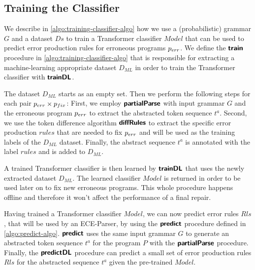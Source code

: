 \subsection{Training the Classifier}
\label{sec:whole-system:training-classifier}

\begin{figure}[t]
  \centering
  \begin{minipage}[t]{0.47\linewidth}
    \centering
    
  \end{minipage}
  \begin{minipage}[t]{0.52\linewidth}
    \centering
    
  \end{minipage}
\end{figure}

We describe in \autoref{algo:training-classifier-algo} how we use a
(probabilistic) grammar $G$ and a dataset $Ds$ to train a Transformer classifier
$Model$ that can be used to predict error production rules for erroneous
programs $p_{err}$. We define the $\bm{\mathsf{train}}$ procedure in
\autoref{algo:training-classifier-algo} that is responsible for extracting a
machine-learning appropriate dataset $D_{ML}$ in order to train the Transformer
classifier with $\bm{\mathsf{trainDL}}$.

The dataset $D_{ML}$ starts as an empty set. Then we perform the following steps
for each pair $p_{err} \times p_{fix}$: First, we employ $\bm{\mathsf{partialParse}}$ with input
grammar $G$ and the erroneous program $p_{err}$ to extract the abstracted token
sequence $t^a$. Second, we use the token difference algorithm $\bm{\mathsf{diffRules}}$ to
extract the specific error production $rules$ that are needed to fix $p_{err}$ and
will be used as the training labels of the $D_{ML}$ dataset. Finally, the
abstract sequence $t^a$ is annotated with the label $rules$ and is added to
$D_{ML}$.

A trained Transformer classifier is then learned by $\bm{\mathsf{trainDL}}$ that uses the
newly extracted dataset $D_{ML}$. The learned classifier $Model$ is returned in
order to be used later on to fix new erroneous programs. This whole procedure
happens offline and therefore it won't affect the performance of a final repair.

Having trained a Transformer classifier $Model$, we can now predict error rules
$Rls$, that will be used by an ECE-Parser, by using the $\bm{\mathsf{predict}}$ procedure
defined in \autoref{algo:predict-algo}. $\bm{\mathsf{predict}}$ uses the same input
grammar $G$ to generate an abstracted token sequence $t^a$ for the program $P$
with the $\bm{\mathsf{partialParse}}$ procedure. Finally, the $\bm{\mathsf{predictDL}}$ procedure can
predict a small set of error production rules $Rls$ for the abstracted sequence
$t^a$ given the pre-trained $Model$.


